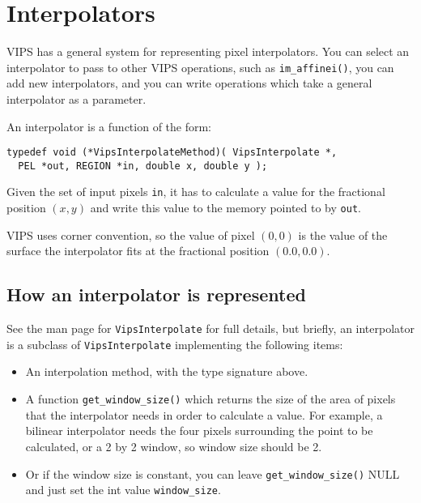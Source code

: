\section{Interpolators}
\label{sec:interpolate}

VIPS has a general system for representing pixel interpolators. You can select
an interpolator to pass to other VIPS operations, such as \verb+im_affinei()+,
you can add new interpolators, and you can write operations which take a
general interpolator as a parameter. 

An interpolator is a function of the form:

\begin{verbatim}
typedef void (*VipsInterpolateMethod)( VipsInterpolate *,
  PEL *out, REGION *in, double x, double y );
\end{verbatim}

\noindent
Given the set of input pixels \verb+in+, it has to calculate a value for the
fractional position $(x, y)$ and write this value to the memory pointed to by
\verb+out+.

VIPS uses corner convention, so the value of pixel $(0, 0)$ is the value of
the surface the interpolator fits at the fractional position $(0.0, 0.0)$.

\subsection{How an interpolator is represented}

See the man page for \verb+VipsInterpolate+ for full details, but briefly,
an interpolator is a subclass of \verb+VipsInterpolate+ implementing the 
following items:

\begin{itemize}
\item
An interpolation method, with the type signature above.

\item
A function \verb+get_window_size()+ which returns the size of the area of
pixels that the interpolator needs in order to calculate a value. For example,
a bilinear interpolator needs the four pixels surrounding the point to be
calculated, or a 2 by 2 window, so window size should be 2.

\item
Or if the window size is constant, you can leave \verb+get_window_size()+
NULL and just set the int value \verb+window_size+.

\end{itemize}

